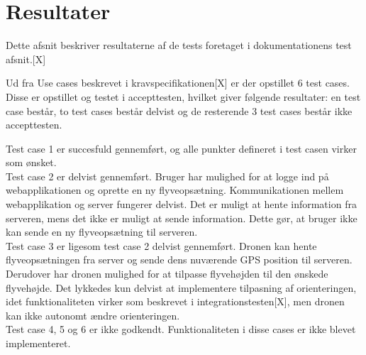 \section{Resultater}

Dette afsnit beskriver resultaterne af de tests foretaget i dokumentationens test afsnit.[X]

Ud fra Use cases beskrevet i kravspecifikationen[X] er der opstillet 6 test cases. Disse er opstillet og testet i accepttesten, hvilket giver følgende resultater: en test case  består, to test cases består delvist og de resterende 3 test cases består ikke accepttesten.

Test case 1 er succesfuld gennemført, og alle punkter defineret i test casen virker som ønsket. \\

Test case 2 er delvist gennemført. Bruger har mulighed for at logge ind på webapplikationen og oprette en ny flyveopsætning. Kommunikationen mellem webapplikation og server fungerer delvist. Det er muligt at hente information fra serveren, mens det ikke er muligt at sende information. Dette gør, at bruger ikke kan sende en ny flyveopsætning til serveren.\\

Test case 3 er ligesom test case 2 delvist gennemført. Dronen kan hente flyveopsætningen fra server og sende dens nuværende GPS position til serveren. Derudover har dronen mulighed for at tilpasse flyvehøjden til den ønskede flyvehøjde. Det lykkedes kun delvist at implementere tilpasning af orienteringen, idet funktionaliteten virker som beskrevet i integrationstesten[X], men dronen kan ikke autonomt ændre orienteringen.\\

Test case 4, 5 og 6 er ikke godkendt. Funktionaliteten i disse cases er ikke blevet implementeret.